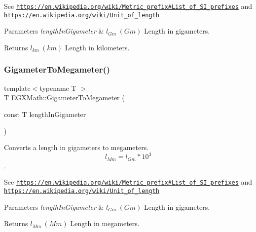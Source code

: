 See \href{https://en.wikipedia.org/wiki/Metric_prefix#List_of_SI_prefixes}{\tt https\+://en.\+wikipedia.\+org/wiki/\+Metric\+\_\+prefix\#\+List\+\_\+of\+\_\+\+S\+I\+\_\+prefixes} and \href{https://en.wikipedia.org/wiki/Unit_of_length}{\tt https\+://en.\+wikipedia.\+org/wiki/\+Unit\+\_\+of\+\_\+length} 
\begin{DoxyParams}{Parameters}
{\em length\+In\+Gigameter} & $ l_{Gm}\ (Gm)$ Length in gigameters. \\
\hline
\end{DoxyParams}
\begin{DoxyReturn}{Returns}
$ l_{km}\ (km)$ Length in kilometers. 
\end{DoxyReturn}
\mbox{\label{group___e_g_x_math-_conversions-_length_conversions-_s_i-_gigameter-_s_i_ga13984c61b3aaa41953de2415c6981f37}} 
\subsubsection{\texorpdfstring{Gigameter\+To\+Megameter()}{GigameterToMegameter()}}
{\footnotesize\ttfamily template$<$typename T $>$ \\
T E\+G\+X\+Math\+::\+Gigameter\+To\+Megameter (\begin{DoxyParamCaption}\item[{const T}]{length\+In\+Gigameter }\end{DoxyParamCaption})}



Converts a length in gigameters to megameters. \[ l_{Mm}=l_{Gm} * 10^{3} \]. 

See \href{https://en.wikipedia.org/wiki/Metric_prefix#List_of_SI_prefixes}{\tt https\+://en.\+wikipedia.\+org/wiki/\+Metric\+\_\+prefix\#\+List\+\_\+of\+\_\+\+S\+I\+\_\+prefixes} and \href{https://en.wikipedia.org/wiki/Unit_of_length}{\tt https\+://en.\+wikipedia.\+org/wiki/\+Unit\+\_\+of\+\_\+length} 
\begin{DoxyParams}{Parameters}
{\em length\+In\+Gigameter} & $ l_{Gm}\ (Gm)$ Length in gigameters. \\
\hline
\end{DoxyParams}
\begin{DoxyReturn}{Returns}
$ l_{Mm}\ (Mm)$ Length in megameters. 
\end{DoxyReturn}
\mbox{\label{group___e_g_x_math-_conversions-_length_conversions-_s_i-_gigameter-_s_i_ga9573f9c296bf9043de80f6f6b13c0aa9}} 
